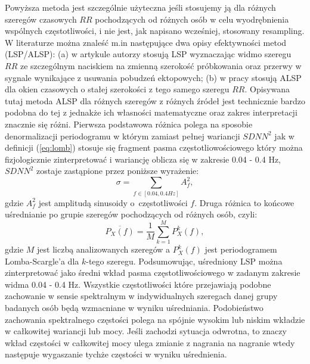Powyższa metoda jest szczególnie użyteczna jeśli stosujemy ją dla różnych szeregów
czasowych $RR$ pochodzących od różnych osób w celu wyodrębnienia wspólnych częstotliwości,
i nie jest, jak napisano wcześniej, stosowany resampling. W literaturze można znaleść m.in
następujące dwa opisy efektywności metod (LSP/ALSP): (a) w artykule \cite{laguna} autorzy 
stosują LSP wyznaczając widmo szeregu $RR$ ze szczególnym naciskiem na zmienną szerokość próbkowania oraz przerwy w sygnale wynikające z usuwania pobudzeń ektopowych; (b) w pracy
\cite{thong} stosują ALSP dla okien czasowych o stałej szerokości z tego
samego szeregu $RR$. Opisywana tutaj metoda ALSP dla różnych szeregów z różnych źródeł
jest technicznie bardzo podobna do tej z \cite{thong} jednakże ich własności matematyczne
oraz zakres interpretacji znacznie się różni. Pierwsza podstawowa różnica polega na sposobie
denormalizacji periodogramu w którym zamiast pełnej wariancji $SDNN^2$ jak w definicji
(\ref{eq:lomb}) stosuje się fragment pasma częstotliowościowego który można fizjologicznie
zinterpretować i wariancję oblicza się w zakresie 0.04 - 0.4 Hz, $SDNN^2$ zostaje zastąpione
przez poniższe wyrażenie:
\begin{equation}
  \sigma = \sum_{f\in[0.04,0.4Hz]}A_f^2,
\end{equation}
gdzie $A_f^2$ jest amplitudą sinusoidy o~częstotliwości $f$. Druga różnica to końcowe
uśrednianie po grupie szeregów pochodzących od różnych osób, czyli:
\begin{equation}
  \overline{P_{X}(f)} = \frac{1}{M}\sum_{k=1}^{M}P_{X}^k(f),
  \label{eq:alsp}
\end{equation}
gdzie $M$ jest liczbą analizowanych szeregów a $P_{X}^k(f)$ jest periodogramem
Lomba-Scargle'a dla $k$-tego szeregu. Podsumowując, uśredniony LSP można zinterpretować
jako średni wkład pasma częstotliwościowego w zadanym zakresie widma 0.04 - 0.4 Hz.
Wszystkie częstotliwości które przejawiają podobne zachowanie w sensie spektralnym w 
indywidualnych szeregach danej grupy badanych osób będą wzmacniane w wyniku uśredniania.
Podobieństwo zachowania spektralnego częstości polega na spójnie wysokim lub niskim
wkładzie w całkowitej wariancji lub mocy. Jeśli zachodzi sytuacja odwrotna, to znaczy wkład
częstości w całkowitej mocy ulega zmianie z nagrania na nagranie wtedy następuje wygaszanie
tychże częstości w wyniku uśrednienia.